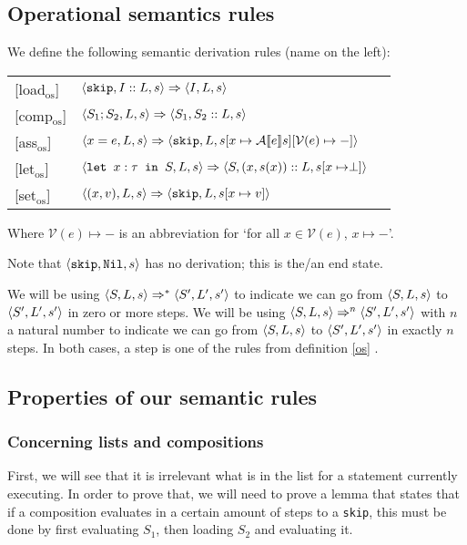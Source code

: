 \subsection{Operational semantics rules}
\begin{definition} 
\label{os}
We define the following semantic derivation rules (name on the left):

\begin{tabular}{p{5em}p{18em}p{13em}}
[load$_{\textrm{os}}$] &
\centering$\langle \texttt{skip}, I::L, s \rangle \Rightarrow \langle I, L, s \rangle$ & \medskip\\

[comp$_{\textrm{os}}$] &
\centering$\langle S_1; S_2, L, s \rangle \Rightarrow \langle S_1, S_2::L, s \rangle$ & \medskip\\

[ass$_{\textrm{os}}$] &
\centering $\langle x = e, L, s \rangle \Rightarrow \langle \texttt{skip}, L, s[x \mapsto \mathcal{A} \llbracket e \rrbracket s][\mathcal{V}(e)\mapsto-] \rangle$ & \medskip\\

[let$_{\textrm{os}}$] &
\centering $\langle \texttt{let }x : \tau \texttt{ in } S, L, s \rangle \Rightarrow \langle S, (x,s(x))::L, s[x\mapsto \perp] \rangle$ & \medskip\\

[set$_{\textrm{os}}$] &
\centering$\langle (x,v), L, s \rangle \Rightarrow \langle \texttt{skip}, L, s[x\mapsto v] \rangle$ & \medskip\\
\end{tabular} 
Where $\mathcal{V}(e)\mapsto-$ is an abbreviation for `for all $x \in \mathcal{V}(e)$, $x \mapsto -$'.
\end{definition} 
Note that $\langle \texttt{skip}, \texttt{Nil}, s \rangle$ has no derivation; this is the/an end state. 

We will be using $\langle S, L, s \rangle \Rightarrow ^{*} \langle S', L', s' \rangle$ to indicate we can go from $\langle S, L, s \rangle$ to $\langle S', L', s' \rangle$ in zero or more steps. We will be using $\langle S, L, s \rangle \Rightarrow ^{n} \langle S', L', s' \rangle$ with $n$ a natural number to indicate we can go from $\langle S, L, s \rangle$ to $\langle S', L', s' \rangle$ in exactly $n$ steps. In both cases, a step is one of the rules from definition \ref{os} .


\subsection{Properties of our semantic rules}

\subsubsection*{Concerning lists and compositions}
First, we will see that it is irrelevant what is in the list for a statement currently executing. In order to prove that, we will need to prove a lemma that states that if a composition evaluates in a certain amount of steps to a \texttt{skip}, this must be done by first evaluating $S_1$, then loading $S_2$ and evaluating it. 

